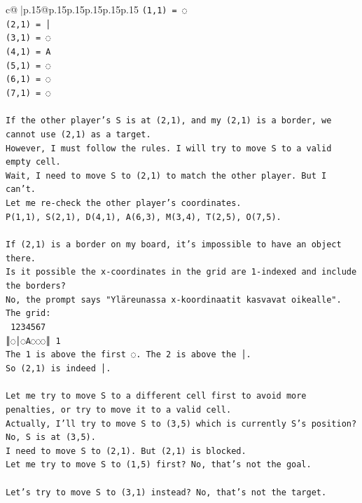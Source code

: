 \documentclass{article}
\begin{document}
{\begin{supertabular}{c@{$\;$}|p{.15\linewidth}@{}p{.15\linewidth}p{.15\linewidth}p{.15\linewidth}p{.15\linewidth}p{.15\linewidth}}
{{{\texttt{(1,1) = ◌} \\
\texttt{(2,1) = │} \\
\texttt{(3,1) = ◌} \\
\texttt{(4,1) = A} \\
\texttt{(5,1) = ◌} \\
\texttt{(6,1) = ◌} \\
\texttt{(7,1) = ◌} \\
\\ 
\texttt{If the other player's S is at (2,1), and my (2,1) is a border, we cannot use (2,1) as a target.} \\
\texttt{However, I must follow the rules. I will try to move S to a valid empty cell.} \\
\texttt{Wait, I need to move S to (2,1) to match the other player. But I can't.} \\
\texttt{Let me re{-}check the other player's coordinates.} \\
\texttt{P(1,1), S(2,1), D(4,1), A(6,3), M(3,4), T(2,5), O(7,5).} \\
\\ 
\texttt{If (2,1) is a border on my board, it's impossible to have an object there.} \\
\texttt{Is it possible the x{-}coordinates in the grid are 1{-}indexed and include the borders?} \\
\texttt{No, the prompt says "Yläreunassa x{-}koordinaatit kasvavat oikealle".} \\
\texttt{The grid:} \\
\texttt{ 1234567} \\
\texttt{║◌│◌A◌◌◌║ 1} \\
\texttt{The 1 is above the first ◌. The 2 is above the │.} \\
\texttt{So (2,1) is indeed │.} \\
\\ 
\texttt{Let me try to move S to a different cell first to avoid more penalties, or try to move it to a valid cell.} \\
\texttt{Actually, I'll try to move S to (3,5) which is currently S's position? No, S is at (3,5).} \\
\texttt{I need to move S to (2,1). But (2,1) is blocked.} \\
\texttt{Let me try to move S to (1,5) first? No, that's not the goal.} \\
\\ 
\texttt{Let's try to move S to (3,1) instead? No, that's not the target.} \\
}}}
\end{supertabular}}
\end{document}
